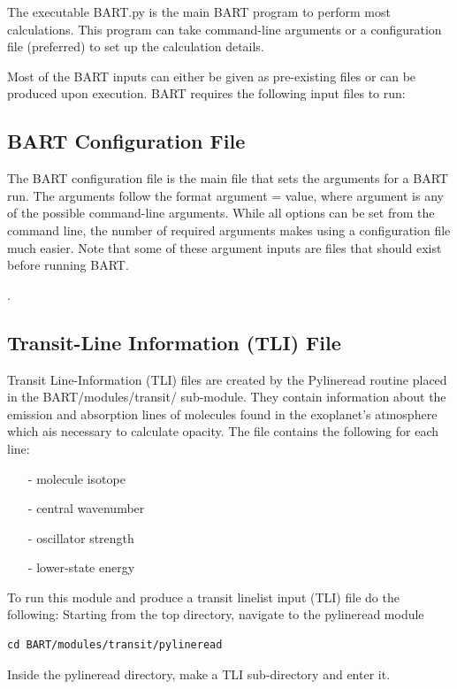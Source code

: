 \documentclass[letterpaper, 12pt]{article}
\begin{document}
The executable BART.py is the main BART program to perform most
calculations.  This program can take command-line arguments or a
configuration file (preferred) to set up the calculation details.

Most of the BART inputs can either be given as pre-existing files or
can be produced upon execution.
BART requires the following input files to run:


\subsection{BART Configuration File}
\label{sec:BARTconfig}
The BART configuration file is the main file that sets the arguments for a BART run. The arguments follow the format {\ttb argument = value}, where {\ttb argument} is any of the possible command-line arguments. While all options can be set from the command line, the number of required arguments makes using a configuration file much easier. Note that some of these argument inputs are files that should exist before running BART.

.

\subsection{Transit-Line Information (TLI) File}
\label{sec:TLI}
Transit Line-Information (TLI) files are created by the Pylineread routine placed in the BART/modules/transit/
sub-module. They contain information about the emission and absorption lines of molecules found in the exoplanet's atmosphere which ais necessary to calculate opacity. The file contains the following for each line:
\begin{enumerate}
\item[-]molecule isotope
\item[-]central wavenumber
\item[-]oscillator strength
\item[-]lower-state energy
\end{enumerate}

\noindent
To run this module and produce a transit linelist input (TLI) file do the following:
\noindent
Starting from the top directory, navigate to the pylineread module

\begin{verbatim}
cd BART/modules/transit/pylineread
\end{verbatim}

\noindent
Inside the pylineread directory, make a TLI sub-directory and enter it.
\end{document}
